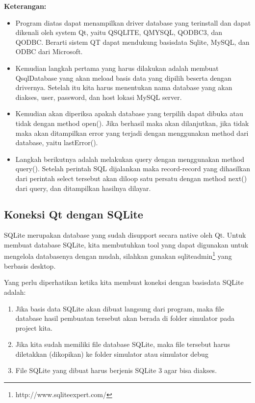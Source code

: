 \textbf{Keterangan:}

\begin{itemize}

\item
  Program diatas dapat menampilkan driver database yang terinstall dan
  dapat dikenali oleh system Qt, yaitu QSQLITE, QMYSQL, QODBC3, dan
  QODBC. Berarti sistem QT dapat mendukung basisdata Sqlite, MySQL, dan
  ODBC dari Microsoft.
\item
  Kemudian langkah pertama yang harus dilakukan adalah membuat
  QsqlDatabase yang akan meload basis data yang dipilih beserta dengan
  drivernya. Setelah itu kita harus menentukan nama database yang akan
  diakses, user, password, dan host lokasi MySQL server.
\item
  Kemudian akan diperiksa apakah database yang terpilih dapat dibuka
  atau tidak dengan method open(). Jika berhasil maka akan dilanjutkan,
  jika tidak maka akan ditampilkan error yang terjadi dengan menggunakan
  method dari database, yaitu lastError().
\item
  Langkah berikutnya adalah melakukan query dengan menggunakan method
  query(). Setelah perintah SQL dijalankan maka record-record yang
  dihasilkan dari perintah select tersebut akan diloop satu persatu
  dengan method next() dari query, dan ditampilkan hasilnya dilayar.
\end{itemize}

\subsection{Koneksi Qt dengan SQLite}\label{koneksi-qt-dengan-sqlite}

SQLite merupakan database yang sudah disupport secara native oleh Qt.
Untuk membuat database SQLite, kita membutuhkan tool yang dapat
digunakan untuk mengelola databasenya dengan mudah, silahkan gunakan
sqliteadmin\footnote{http://www.sqliteexpert.com/} yang berbasis desktop.

Yang perlu diperhatikan ketika kita membuat koneksi dengan basisdata
SQLite adalah:

\begin{enumerate}


\item
  Jika basis data SQLite akan dibuat langsung dari program, maka file
  database hasil pembuatan tersebut akan berada di folder simulator pada
  project kita.
\item
  Jika kita sudah memiliki file database SQLite, maka file tersebut
  harus diletakkan (dikopikan) ke folder simulator atau simulator \textfractionsolidus debug
\item
  File SQLite yang dibuat harus berjenis SQLite 3 agar bisa diakses.
\end{enumerate}

